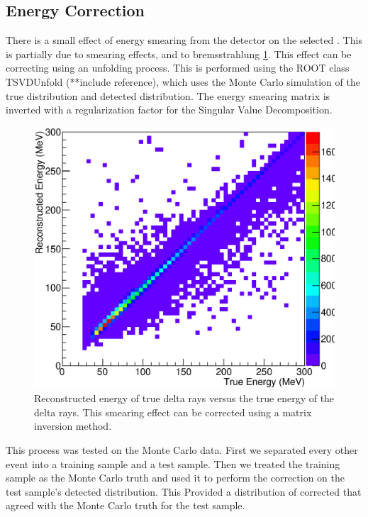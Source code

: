 \subsection{Energy Correction}
	There is a small effect of energy smearing from the detector on the selected \deltarays. This is partially due to smearing effects, and to bremsstrahlung \ref{fig:BPsmear}. This effect can be correcting using an unfolding  process. This is performed using the ROOT class TSVDUnfold (**include reference), which uses the Monte Carlo simulation of the true distribution and detected distribution. The energy smearing matrix is inverted with a regularization factor for the Singular Value Decomposition. 
	\begin{figure}[htp]
		\centering
		\includegraphics[scale=0.5]{figures/Energy_Smearing.eps}
		\caption{Reconstructed energy of true delta rays versus the true energy of the delta rays. This smearing effect can be corrected using a matrix inversion method.}
		\label{fig:BPsmear}
	\end{figure}

	This process was tested on the Monte Carlo data. First we separated every other event into a training sample and a test sample. Then we treated the training sample as the Monte Carlo truth and used it to perform the correction on the test sample’s detected distribution. This Provided a distribution of corrected \deltarays that agreed with the Monte Carlo truth for the test sample.

